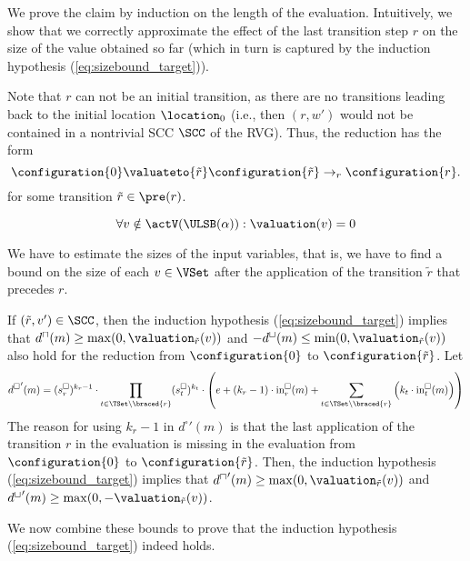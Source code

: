 We prove the claim by induction on the length of the evaluation.
Intuitively, we show that we correctly approximate the effect of the last transition step $r$ on the size of the value obtained so far (which in turn is captured by the induction hypothesis (\ref{eq:sizebound_target})).

Note that $r$ can not be an initial transition, as there are no transitions leading back to the initial location $\location_0$
(i.e., then $(r, w')$ would not be contained in a nontrivial SCC $\SCC$ of the RVG).
Thus, the reduction has the form
\[ \configuration{0} \valuateto{\tilde{r}} \configuration{\tilde{r}} \rightarrow_r \configuration{r}. \]
for some transition $\tilde{r} \in \pre(r)$.

\begin{equation} \label{eq:nonactiveequalzero}
  \forall v \notin \actV(\ULSB(\alpha)): \valuation(v) = 0
\end{equation}

We have to estimate the sizes of the input variables,
that is, we have to find a bound on the size of each $v \in \VSet$ after the application of the transition $\tilde{r}$ that precedes $r$.

If $(\tilde{r}, v') \in \SCC$, then the induction hypothesis (\ref{eq:sizebound_target}) implies that $d^\sqcap(m) \geq \max(0, \valuation_{\tilde{r}}(v))$ and $-d^\sqcup(m) \leq \min(0, \valuation_{\tilde{r}}(v))$ also hold for the reduction from $\configuration{0}$ to $\configuration{\tilde{r}}$.
Let
\begin{equation} \label{eq:induction_consequence}
  {d^\square}'(m) = (s^\square_r)^{k_r - 1} \cdot \prod_{t \in \TSet \setminus \braced{r}} (s^\square_t)^{k_t} \cdot \left( e + \left( k_r - 1 \right) \cdot \text{in}^\square_r(m) + \sum_{t \in \TSet \setminus \braced{r}} \left( k_t \cdot \text{in}^\square_t(m) \right) \right)
\end{equation}
The reason for using $k_r - 1$ in ${d^\square}'(m)$ is that the last application of the transition $r$ in the evaluation is missing in the evaluation from $\configuration{0}$ to $\configuration{\tilde{r}}$.
Then, the induction hypothesis (\ref{eq:sizebound_target}) implies that ${d^\sqcap}'(m) \geq \max(0, \valuation_{\tilde{r}}(v))$ and ${d^\sqcup}'(m) \geq \max(0, -\valuation_{\tilde{r}}(v))$.

We now combine these bounds to prove that the induction hypothesis (\ref{eq:sizebound_target}) indeed holds.

